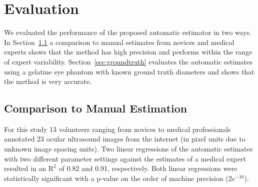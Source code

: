 \documentclass{llncs}
\begin{document}
\section{Evaluation}
We evaluated the performance of the proposed automatic estimator in two ways.
In Section~\ref{sec:manual} a comparison to manual estimates from novices and
medical experts shows that the method has high precision and performs within the
range of expert variability. Section~\ref{sec:groundtruth} evaluates the
automatic estimates using a gelatine eye phantom with known ground truth
diameters and shows that the method is very accurate. 

\subsection{Comparison to Manual Estimation}
\label{sec:manual}
For this study 13 volunteers ranging from novices to medical professionals annotated
23 ocular ultrasound images from the internet (in pixel units due to unknown
image spacing units).  Two linear regressions of the automatic estimates with
two different parameter settings against the estimates of a medical expert
resulted in an $\mathrm{R}^2$ of 0.82 and 0.91, respectively. Both linear
regressions were statistically significant with a p-value on the order of
machine precision ($2e^{-16}$).

\end{document}
